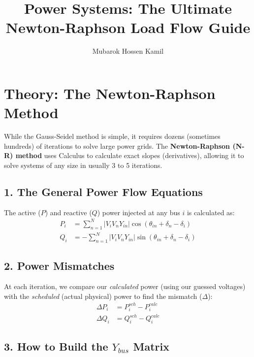 \documentclass[11pt]{article}
\begin{document}
\title{\textbf{Power Systems: The Ultimate Newton-Raphson Load Flow Guide}}
\author{Mubarok Hossen Kamil}
\date{}
\maketitle

\section*{\textcolor{mainblue}{Theory: The Newton-Raphson Method}}

While the Gauss-Seidel method is simple, it requires dozens (sometimes hundreds) of iterations to solve large power grids. The \textbf{Newton-Raphson (N-R) method} uses Calculus to calculate exact slopes (derivatives), allowing it to solve systems of any size in usually 3 to 5 iterations.

\subsection*{1. The General Power Flow Equations}
The active ($P$) and reactive ($Q$) power injected at any bus $i$ is calculated as:
\begin{align}
    P_i &= \sum_{n=1}^{N} |V_i V_n Y_{in}| \cos(\theta_{in} + \delta_n - \delta_i) \label{eq:P_theory} \\
    Q_i &= -\sum_{n=1}^{N} |V_i V_n Y_{in}| \sin(\theta_{in} + \delta_n - \delta_i) \label{eq:Q_theory}
\end{align}

\subsection*{2. Power Mismatches}
At each iteration, we compare our \textit{calculated} power (using our guessed voltages) with the \textit{scheduled} (actual physical) power to find the mismatch ($\Delta$):
\begin{align*}
    \Delta P_i &= P_i^{sch} - P_i^{calc} \\
    \Delta Q_i &= Q_i^{sch} - Q_i^{calc}
\end{align*}


\subsection*{3. How to Build the $Y_{bus}$ Matrix}
\end{document}
